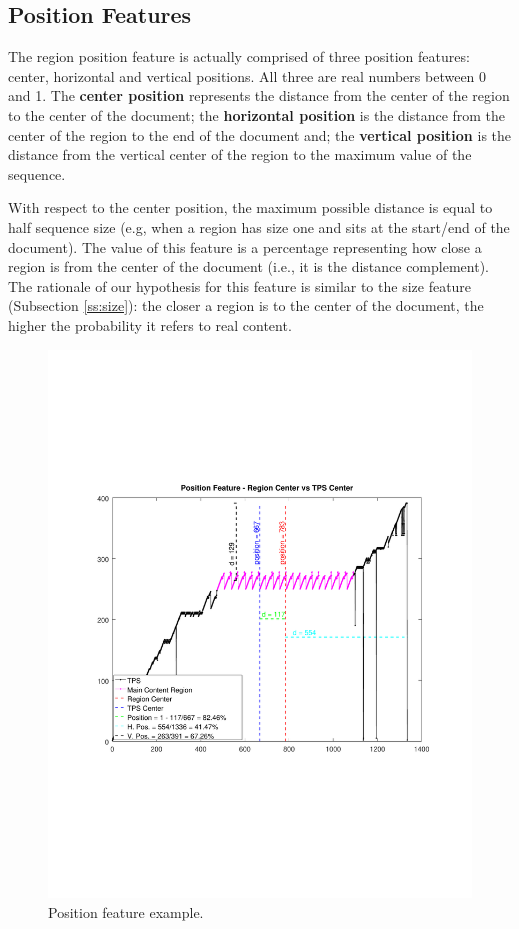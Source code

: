 \subsection{Position Features}\label{ss:pos}
The region position feature is actually comprised of three position features:
center, horizontal and vertical positions. All three are real numbers between 0
and 1. The \textbf{center position} represents the distance from the center of
the region to the center of the document; the \textbf{horizontal position} is
the distance from the center of the region to the end of the document and; the
\textbf{vertical position} is the distance from the vertical center of the
region to the maximum value of the sequence.

With respect to the center position, the maximum possible distance is equal to
half sequence size (e.g, when a region has size one and sits at the start/end of
the document). The value of this feature is a percentage representing how close
a region is from the center of the document (i.e., it is the distance
complement). The rationale of our hypothesis for this feature is similar to the
size feature (Subsection \ref{ss:size}): the closer a region is to the center of the
document, the higher the probability it refers to real content.

\begin{figure}[h]
  \centering
     \includegraphics[trim={2.5cm 7.4cm 2.2cm 7.4cm}, clip,  width=\columnwidth]{img/position.pdf}
  \caption{Position feature example.}
  \label{fig:position}
\end{figure}

